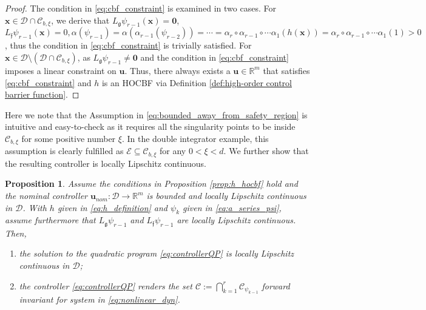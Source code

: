 \documentclass[letterpaper, 10 pt, journal, twoside]{IEEEtran}
\theoremstyle{plain}
\newtheorem{proposition}{Proposition}
\newcommand{\myvar}[1]{\bm{#1}}
\newcommand{\myset}[1]{\mathscr{#1}}
\begin{document}
\begin{proof}
The condition in \eqref{eq:cbf_constraint} is examined in  two cases. For $\myvar{x}\in \myset{D}\cap \myset{C}_{b,\xi}$, we derive that $L_{\mathfrak{g}}\psi_{r-1}(\myvar{x}) = \myvar{0}$,  $L_{\mathfrak{f}}\psi_{r-1}(\myvar{x}) = 0, \alpha(\psi_{r-1}) = \alpha( \alpha_{r-1}(\psi_{r-2})) = \cdots = \alpha_{r} \circ \alpha_{r-1} \circ \cdots \alpha_{1}(h(\myvar{x})) = \alpha_{r} \circ \alpha_{r-1} \circ \cdots \alpha_{1}(1) > 0 $, thus the condition in \eqref{eq:cbf_constraint} is trivially satisfied. For $ \myvar{x} \in \myset{D}\setminus (\myset{D} \cap \myset{C}_{b,\xi}) $, as $L_{\mathfrak{g}} \psi_{r-1} \neq \myvar{0}$ and the condition in \eqref{eq:cbf_constraint} imposes a linear constraint on $\myvar{u}$. {Thus}, there always exists a $\myvar{u} \in \mathbb{R}^m$ that satisfies \eqref{eq:cbf_constraint} and $h$ is an HOCBF via Definition \ref{def:high-order control barrier function}. 
\end{proof}



Here we note that the Assumption in \eqref{eq:bounded_away_from_safety_region} is intuitive and easy-to-check as it requires all the singularity points {to be} inside $\myset{C}_{b,\xi}$ for some positive number $\xi$. In the double integrator example, this assumption is clearly fulfilled as $\myset{E}  \subseteq \myset{C}_{b,\xi}$ for any $ 0<\xi<d $. We further show that the resulting controller is locally Lipschitz continuous. 

\begin{proposition}\label{prop:lipschitz_continuity_solution}
  Assume  the conditions in Proposition \ref{prop:h_hocbf}  hold and the nominal controller $\myvar{u}_{nom} : \myset{D} \to \mathbb{R}^m$ is  bounded and locally Lipschitz continuous in $\myset{D}$. With $h$ given in \eqref{eq:h_definition} and $\psi_{k}$ given in \eqref{eq:a_series_psi}, assume furthermore that $L_{\mathfrak{g}} \psi_{r-1}$ and $L_{\mathfrak{f}} \psi_{r-1}$ are locally Lipschitz continuous. Then, 
   \begin{enumerate}
        \item  the solution to the quadratic program  \eqref{eq:controllerQP} is locally Lipschitz continuous in $\myset{D}$;
     \item  the controller \eqref{eq:controllerQP} renders the set $\myset{C}:= \bigcap_{k =1}^{r}  \myset{C}_{\psi_{k-1}} $ forward invariant for system in \eqref{eq:nonlinear_dyn}.
 \end{enumerate}
\end{proposition} 
\end{document}
